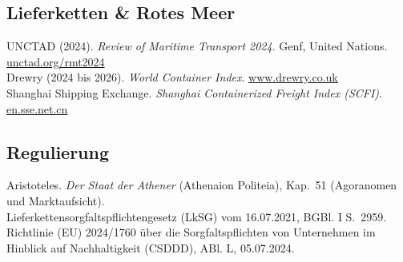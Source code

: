 \documentclass[11pt, a4paper]{article}
\begin{document}
\subsection*{Lieferketten \& Rotes Meer}
UNCTAD (2024). \emph{Review of Maritime Transport 2024}. Genf, United Nations. \href{https://unctad.org/rmt2024}{unctad.org/rmt2024}\\
Drewry (2024 bis 2026). \emph{World Container Index}. \href{https://www.drewry.co.uk}{www.drewry.co.uk}\\
Shanghai Shipping Exchange. \emph{Shanghai Containerized Freight Index (SCFI)}. \href{https://en.sse.net.cn}{en.sse.net.cn}

\subsection*{Regulierung}
Aristoteles. \emph{Der Staat der Athener} (Athenaion Politeia), Kap.~51 (Agoranomen und Marktaufsicht).\\
Lieferkettensorgfaltspflichtengesetz (LkSG) vom 16.07.2021, BGBl. I S.~2959.\\
Richtlinie (EU) 2024/1760 über die Sorgfaltspflichten von Unternehmen im Hinblick auf Nachhaltigkeit (CSDDD), ABl. L, 05.07.2024.
\end{document}
